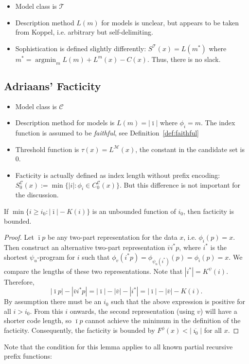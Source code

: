 \documentclass{style/llncs}
\newcommand{\M}{\mathscr M}
\newcommand{\C}{\mathscr C}
\newcommand{\T}{\mathscr T}
\newcommand{\argmin}{\mathop{\arg\min}}
\begin{document}
\begin{itemize}
\item Model class is $\T$
\item Description method $L(m)$ for models is unclear, but appears to be
  taken from Koppel, i.e. arbitrary but self-delimiting.
\item Sophistication is defined slightly differently: $S^\T(x)=L(m^*)$ where $m^*=\argmin_m L(m)+L^m(x)-C(x)$. Thus, there is no slack.
\end{itemize}


\subsection{Adriaans' Facticity}

\begin{itemize}
\item Model class is $\C$
\item Description method for models is $L(m)=|\bar\imath|$ where
  $\phi_i=m$. The index function is assumed to be \emph{faithful}, see
  Definition~\ref{def:faithful}
\item Threshold function is $\tau(x)=L^\M(x)$, the constant in the candidate set is $0$.
\item Facticity is actually defined as index length without prefix
  encoding:  $S^\C_0(x):=\min\{|i|:\phi_i\in C^\C_0(x)\}$. But this
  difference is not important for the discussion.
\end{itemize}


\begin{lemma}
  If $\min\{i\ge i_0:|\bar\imath|-K(i)\}$ is an unbounded function of $i_0$, then facticity is bounded.
\end{lemma}
\begin{proof}
Let $\bar\imath p$ be any two-part representation for the data $x$, i.e. $\phi_i(p)=x$. Then construct an alternative two-part representation $\bar vi^* p$, where $i^*$ is the shortest $\psi_u$-program for $i$ such that $\phi_v(i^* p)=\phi_{\psi_u(i^*)}(p) = \phi_i(p)=x$. We compare the lengths of these two representations. Note that $|i^*|=K^\psi(i)$. Therefore,
\[
|\bar\imath p|-|\bar v i^* p| = |\bar\imath|-|\bar v| - |i^*| = |\bar\imath|-|\bar v|-K(i).
\]
By assumption there must be an $i_0$ such that the above expression is positive for all $i>i_0$. From this $i$ onwards, the second representation (using $v$) will have a shorter code length, so $\bar\imath p$ cannot achieve the minimum in the definition of the facticity. Consequently, the facticity is bounded by $F^\phi(x)<|\overline{\imath_0}|$ for all $x$. 
\end{proof}
Note that the condition for this lemma applies to all known partial recursive prefix functions:
\end{document}
